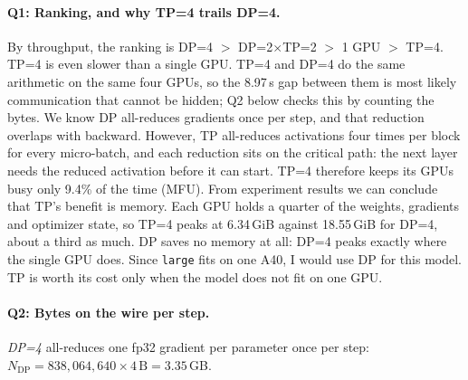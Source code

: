 \documentclass[10pt]{article}
\begin{document}
\paragraph{Q1: Ranking, and why TP=4 trails DP=4.}
By throughput, the ranking is DP=4 $>$ DP=2$\times$TP=2 $>$ 1 GPU $>$ TP=4.
TP=4 is even slower than a single GPU.
TP=4 and DP=4 do the same arithmetic on the same four GPUs, so the
8.97\,s gap between them is most likely communication that cannot be
hidden; Q2 below checks this by counting the bytes. We know DP
all-reduces gradients once per step, and that reduction overlaps with
backward. However, TP all-reduces activations four times per block for every
micro-batch, and each reduction sits on the critical path: the next layer
needs the reduced activation before it can start. TP=4 therefore keeps its
GPUs busy only 9.4\% of the time (MFU).
From experiment results we can conclude that TP's benefit is memory.
Each GPU holds a quarter of the weights, gradients
and optimizer state, so TP=4 peaks at 6.34\,GiB against 18.55\,GiB
for DP=4, about a third as much. DP saves no memory at all: DP=4 peaks
exactly where the single GPU does.
Since \texttt{large} fits on one A40, I would use DP for this model.
TP is worth its cost only when the model does not fit on one GPU.

\paragraph{Q2: Bytes on the wire per step.}
\emph{DP=4} all-reduces one fp32 gradient per parameter once per step:
$N_\text{DP} = 838{,}064{,}640 \times 4\,\text{B} = 3.35$\,GB.
\end{document}

